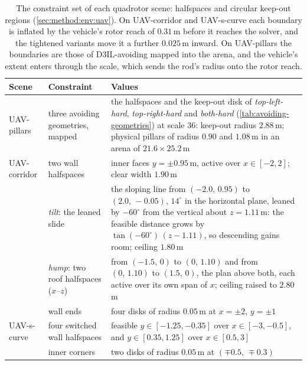 \begin{table}[!htbp]
  \caption[Quadrotor scenes]{The constraint set of each quadrotor scene: halfspaces and circular
  keep-out regions (\autoref{sec:method:env:uav}). On UAV-corridor and UAV-s-curve each boundary is
  inflated by the vehicle's rotor reach of $0.31$\,m before it reaches the solver, and the tightened
  variants move it a further $0.025$\,m inward. On UAV-pillars the boundaries are those of D3IL-avoiding
  mapped into the arena, and the vehicle's extent enters through the scale, which sends the rod's radius
  onto the rotor reach.}
  \label{tab:uav-scenes}
  \centering
  \small
  \setlength{\tabcolsep}{8pt}
  \renewcommand{\arraystretch}{1.25}
  \begin{tabularx}{\linewidth}{@{}l>{\raggedright\arraybackslash}p{3.5cm} X@{}}
    \toprule
    Scene & Constraint & Values \\
    \midrule
    UAV-pillars
      & three avoiding geometries, mapped & the halfspaces and the keep-out disk of \emph{top-left-hard}, \emph{top-right-hard} and \emph{both-hard} (\autoref{tab:avoiding-geometries}) at scale $36$: keep-out radius $2.88$\,m; physical pillars of radius $0.90$ and $1.08$\,m in an arena of $21.6\times25.2$\,m \\
    \addlinespace[2pt]
    UAV-corridor
      & two wall halfspaces & inner faces $y=\pm0.95$\,m, active over $x\in[-2,2]$; clear width $1.90$\,m \\
      & \emph{tilt}: the leaned slide & the sloping line from $(-2.0,\,0.95)$ to $(2.0,\,-0.05)$, $14^\circ$ in the horizontal plane, leaned by $-60^\circ$ from the vertical about $z=1.11$\,m: the feasible distance grows by $\tan(-60^\circ)\,(z-1.11)$, so descending gains room; ceiling $1.80$\,m \\
      & \emph{hump}: two roof halfspaces ($x$--$z$) & from $(-1.5,\,0)$ to $(0,\,1.10)$ and from $(0,\,1.10)$ to $(1.5,\,0)$, the plan above both, each active over its own span of $x$; ceiling raised to $2.80$\,m \\
      & wall ends & four disks of radius $0.05$\,m at $x=\pm2$, $y=\pm1$ \\
    \addlinespace[2pt]
    UAV-s-curve
      & four switched wall halfspaces & feasible $y\in[-1.25,-0.35]$ over $x\in[-3,-0.5]$, and $y\in[0.35,1.25]$ over $x\in[0.5,3]$ \\
      & inner corners & two disks of radius $0.05$\,m at $(\mp0.5,\,\mp0.3)$ \\
    \bottomrule
  \end{tabularx}
\end{table}

